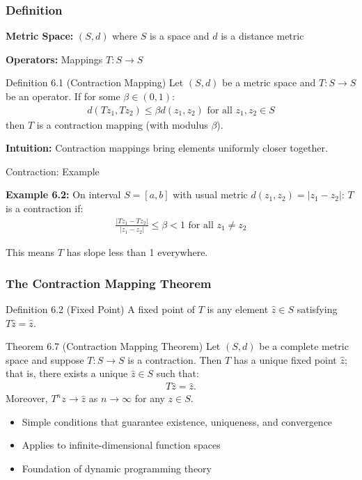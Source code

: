 \documentclass[9pt,aspectratio=169]{beamer}
\begin{document}
\begin{frame}
\frametitle{Definition}

\textbf{Metric Space:} $(S,d)$ where $S$ is a space and $d$ is a distance metric

\textbf{Operators:} Mappings $T: S \to S$ 

\begin{block}{Definition 6.1 (Contraction Mapping)}
Let $(S,d)$ be a metric space and $T: S \to S$ be an operator. If for some $\beta \in (0,1)$:
\begin{align*}
d(Tz_1, Tz_2) \leq \beta d(z_1, z_2) \text{ for all } z_1, z_2 \in S
\end{align*}
then $T$ is a contraction mapping (with modulus $\beta$).
\end{block}

\vspace{0.3cm}

\textbf{Intuition:} Contraction mappings bring elements uniformly closer together.

\end{frame}

\begin{frame}{Contraction: Example}
    
\textbf{Example 6.2:} On interval $S = [a,b]$ with usual metric $d(z_1,z_2) = |z_1 - z_2|$:
$T$ is a contraction if:
\begin{align*}
\frac{|Tz_1 - Tz_2|}{|z_1 - z_2|} \leq \beta < 1 \text{ for all } z_1 \neq z_2
\end{align*}

This means $T$ has slope less than 1 everywhere.

\end{frame}

\begin{frame}
\frametitle{The Contraction Mapping Theorem}

\begin{block}{Definition 6.2 (Fixed Point)}
A fixed point of $T$ is any element $\hat{z} \in S$ satisfying $T\hat{z} = \hat{z}$.
\end{block}


\begin{block}{Theorem 6.7 (Contraction Mapping Theorem)}
    Let $(S,d)$ be a complete metric space and suppose $T: S \to S$ is a
    contraction. Then $T$ has a unique fixed point $\hat{z}$; that is, there
    exists a unique $\hat{z} \in S$ such that:
    \begin{align*}
        T\hat{z} = \hat{z}.
    \end{align*}
    Moreover, $T^nz \to \hat{z}$ as $n \to \infty$ for any $z \in S$.
\end{block}

\begin{itemize}
    \item Simple conditions that guarantee existence, uniqueness, and convergence
    \item Applies to infinite-dimensional function spaces
    \item Foundation of dynamic programming theory
\end{itemize}

\end{frame}
\end{document}
